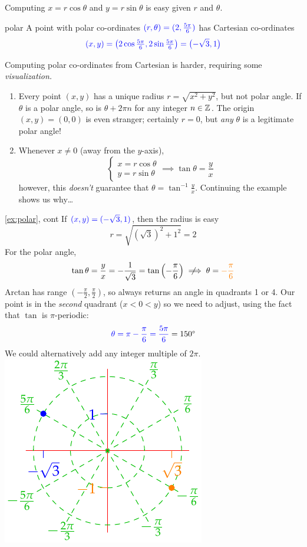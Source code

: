 Computing $x=r\cos\theta$ and $y=r\sin\theta$ is easy given $r$ and $\theta$.

\begin{example}{}{polar}
	A point with polar co-ordinates $\textcolor{blue}{(r,\theta)=(2,\frac{5\pi}6)}$ has Cartesian co-ordinates
	\[
		\textcolor{blue}{(x,y)=\bigl(2\cos\tfrac{5\pi}6,2\sin\tfrac{5\pi}6\bigr) =\bigl(-\sqrt 3,1\bigr)}
	\]
\end{example}

Computing polar co-ordinates from Cartesian is harder, requiring some \emph{visualization.}  
\begin{enumerate}
  \item Every point $(x,y)$ has a unique radius $r=\sqrt{x^2+y^2}$, but not polar angle. If $\theta$ is a polar angle, so is $\theta+2\pi n$ for any integer $n\in\Z$. The origin $(x,y)=(0,0)$ is even stranger; certainly $r=0$, but \emph{any} $\theta$ is a legitimate polar angle!
  \item Whenever $x\neq 0$ (away from the $y$-axis),
  \[
  	\begin{cases}
  		x=r\cos\theta\\
  		y=r\sin\theta
  	\end{cases}
  	\implies \tan\theta=\frac yx
  \]
	however, this \emph{doesn't} guarantee that $\theta=\tan^{-1}\frac yx$. Continuing the example shows us why\ldots
\end{enumerate}

\begin{example*}[lower separated=false, sidebyside, sidebyside align=top seam, sidebyside gap=0pt, righthand width=0.35\linewidth]{\ref{ex:polar}, cont}{}
	If $\textcolor{blue}{(x,y)=(-\sqrt 3,1)}$, then the radius is easy
	\[
		r=\sqrt{(\sqrt 3)^2+1^2}=2
	\]
	For the polar angle,
	\[
		\tan\theta=\frac yx=-\frac 1{\sqrt 3}=\tan\left(-\frac\pi 6\right)\notimplies \theta=\textcolor{orange}{-\frac\pi 6}
	\]
	Arctan has range $(-\frac\pi 2,\frac\pi 2)$, so always returns an angle in quadrants 1 or 4. Our point is in the \emph{second} quadrant ($x<0<y$) so we need to adjust, using the fact that $\tan$ is $\pi$-periodic:
	\[
		\textcolor{blue}{\theta=\pi-\frac\pi 6=\frac{5\pi}6} =\ang{150}
	\]
	We could alternatively add any integer multiple of $2\pi$.
	\tcblower
	\flushright\includegraphics{expolar}
\end{example*}


